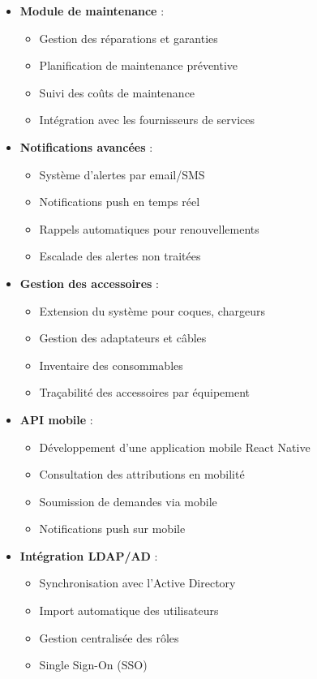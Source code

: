 \documentclass[12pt,a4paper]{report}
\begin{document}
\begin{itemize}

\item \textbf{Module de maintenance} : 
  \begin{itemize}
  \item Gestion des réparations et garanties
  \item Planification de maintenance préventive
  \item Suivi des coûts de maintenance
  \item Intégration avec les fournisseurs de services
\end{itemize}


\item \textbf{Notifications avancées} : 
  \begin{itemize}
  \item Système d'alertes par email/SMS
  \item Notifications push en temps réel
  \item Rappels automatiques pour renouvellements
  \item Escalade des alertes non traitées
  \end{itemize}

\item \textbf{Gestion des accessoires} : 
  \begin{itemize}
  \item Extension du système pour coques, chargeurs
  \item Gestion des adaptateurs et câbles
  \item Inventaire des consommables
  \item Traçabilité des accessoires par équipement
  \end{itemize}

\item \textbf{API mobile} : 
  \begin{itemize}
  \item Développement d'une application mobile React Native
  \item Consultation des attributions en mobilité
  \item Soumission de demandes via mobile
  \item Notifications push sur mobile
  \end{itemize}

\item \textbf{Intégration LDAP/AD} : 
  \begin{itemize}
  \item Synchronisation avec l'Active Directory
  \item Import automatique des utilisateurs
  \item Gestion centralisée des rôles
  \item Single Sign-On (SSO)
  \end{itemize}


\end{itemize}
\end{document}
